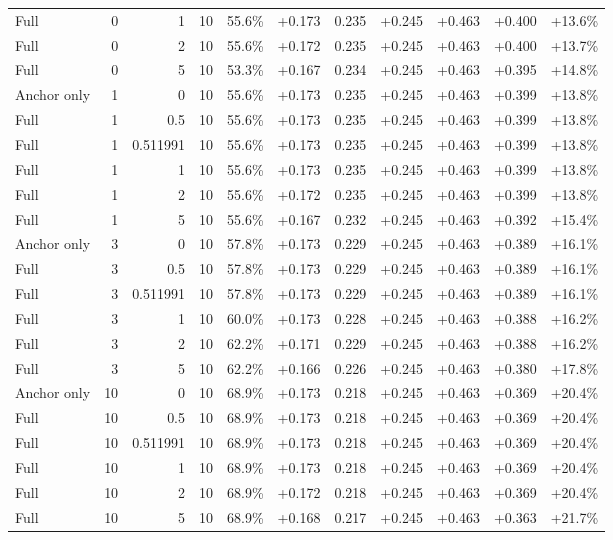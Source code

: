 \begin{table}[htbp]
\begin{tabular}{lrrrccccccc}
Full & 0 & 1 & 10 & 55.6\% & +0.173 & 0.235 & +0.245 & +0.463 & +0.400 & +13.6\% \\
Full & 0 & 2 & 10 & 55.6\% & +0.172 & 0.235 & +0.245 & +0.463 & +0.400 & +13.7\% \\
Full & 0 & 5 & 10 & 53.3\% & +0.167 & 0.234 & +0.245 & +0.463 & +0.395 & +14.8\% \\
Anchor only & 1 & 0 & 10 & 55.6\% & +0.173 & 0.235 & +0.245 & +0.463 & +0.399 & +13.8\% \\
Full & 1 & 0.5 & 10 & 55.6\% & +0.173 & 0.235 & +0.245 & +0.463 & +0.399 & +13.8\% \\
Full & 1 & 0.511991 & 10 & 55.6\% & +0.173 & 0.235 & +0.245 & +0.463 & +0.399 & +13.8\% \\
Full & 1 & 1 & 10 & 55.6\% & +0.173 & 0.235 & +0.245 & +0.463 & +0.399 & +13.8\% \\
Full & 1 & 2 & 10 & 55.6\% & +0.172 & 0.235 & +0.245 & +0.463 & +0.399 & +13.8\% \\
Full & 1 & 5 & 10 & 55.6\% & +0.167 & 0.232 & +0.245 & +0.463 & +0.392 & +15.4\% \\
Anchor only & 3 & 0 & 10 & 57.8\% & +0.173 & 0.229 & +0.245 & +0.463 & +0.389 & +16.1\% \\
Full & 3 & 0.5 & 10 & 57.8\% & +0.173 & 0.229 & +0.245 & +0.463 & +0.389 & +16.1\% \\
Full & 3 & 0.511991 & 10 & 57.8\% & +0.173 & 0.229 & +0.245 & +0.463 & +0.389 & +16.1\% \\
Full & 3 & 1 & 10 & 60.0\% & +0.173 & 0.228 & +0.245 & +0.463 & +0.388 & +16.2\% \\
Full & 3 & 2 & 10 & 62.2\% & +0.171 & 0.229 & +0.245 & +0.463 & +0.388 & +16.2\% \\
Full & 3 & 5 & 10 & 62.2\% & +0.166 & 0.226 & +0.245 & +0.463 & +0.380 & +17.8\% \\
Anchor only & 10 & 0 & 10 & 68.9\% & +0.173 & 0.218 & +0.245 & +0.463 & +0.369 & +20.4\% \\
Full & 10 & 0.5 & 10 & 68.9\% & +0.173 & 0.218 & +0.245 & +0.463 & +0.369 & +20.4\% \\
Full & 10 & 0.511991 & 10 & 68.9\% & +0.173 & 0.218 & +0.245 & +0.463 & +0.369 & +20.4\% \\
Full & 10 & 1 & 10 & 68.9\% & +0.173 & 0.218 & +0.245 & +0.463 & +0.369 & +20.4\% \\
Full & 10 & 2 & 10 & 68.9\% & +0.172 & 0.218 & +0.245 & +0.463 & +0.369 & +20.4\% \\
Full & 10 & 5 & 10 & 68.9\% & +0.168 & 0.217 & +0.245 & +0.463 & +0.363 & +21.7\% \\

\end{tabular}
\end{table}
